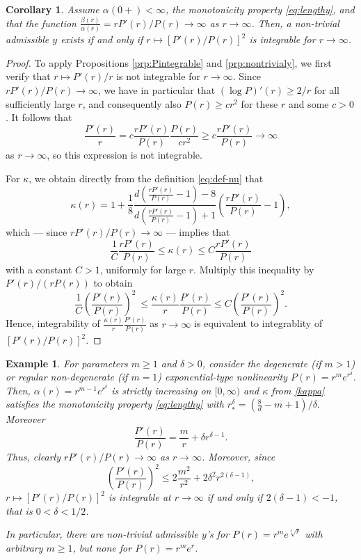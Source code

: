 \documentclass[reqno]{amsart}
\newtheorem{corollary}[lemma]{Corollary}
\newtheorem{example}[lemma]{Example}
\begin{document}
%
\begin{corollary}
    Assume $\alpha(0+)<\infty$, the monotonicity property \eqref{eq:lengthy}, and that the function $\frac{\beta(r)}{\alpha(r)}= rP'(r)/P(r)\to\infty$ as $r\to\infty$. Then, a non-trivial admissible $y$ exists if and only if $r\mapsto[P'(r)/P(r)]^2$ is integrable for $r\to\infty$.
\end{corollary}
%
\begin{proof}
    To apply Propositions \ref{prp:Pintegrable} and \ref{prp:nontrivialy}, we first verify that $r\mapsto P'(r)/r$ is not integrable for $r\to\infty$. Since $rP'(r)/P(r)\to\infty$, we have in particular that $(\log P)'(r)\ge 2/r$ for all sufficiently large $r$, and consequently also $P(r)\ge cr^2$ for these $r$ and some $c>0$. It follows that
    \[ \frac{P'(r)}r = c\frac{rP'(r)}{P(r)}\frac{P(r)}{cr^2} \ge c\frac{rP'(r)}{P(r)} \to \infty \]
    as $r\to\infty$, so this expression is not integrable.  
  
    For $\kappa$, we obtain directly from the definition \eqref{eq:def-nu} that
    \begin{equation}\label{kappa}
     \kappa(r) = 1+ \frac18\frac{d\left(\frac{rP'(r)}{P(r)}-1\right)-8}{d\left(\frac{rP'(r)}{P(r)}-1\right)+1}\left(\frac{rP'(r)}{P(r)}-1\right), 
    \end{equation}
    which --- since $rP'(r)/P(r)\to\infty$ --- implies that 
    \[ \frac1C\frac{rP'(r)}{P(r)} \le \kappa(r) \le C\frac{rP'(r)}{P(r)} \]
    with a constant $C>1$, uniformly for large $r$.
    Multiply this inequality by $P'(r)/(rP(r))$ to obtain
    \[ \frac1C\left(\frac{P'(r)}{P(r)}\right)^2\ \le \frac{\kappa(r)}r\frac{P'(r)}{P(r)} \le C\left(\frac{P'(r)}{P(r)}\right)^2. \]
    Hence, integrability of $\frac{\kappa(r)}r\frac{P'(r)}{P(r)}$ as $r\to\infty$ is equivalent to integrablity of $[P'(r)/P(r)]^2$.
\end{proof}
%
\begin{example}\label{ex:power-exp}
    For parameters $m\ge1$ and $\delta>0$, consider the degenerate (if $m>1$) or regular non-degenerate (if $m=1$) exponential-type nonlinearity $P(r)=r^me^{r^\delta}$. 
    Then, $\alpha(r)=r^{m-1}e^{r^\delta}$ is strictly increasing on $[0,\infty)$ and $\kappa$ from \eqref{kappa} satisfies the monotonicity property \eqref{eq:lengthy} with $r_*^\delta=(\frac8d-m+1)/\delta.$  
    Moreover  
    \[\frac{P'(r)}{P(r)} = \frac mr + \delta r^{\delta-1}. \]
    Thus, clearly $rP'(r)/P(r)\to\infty$ as $r\to\infty$. Moreover, since
    \[ 
    \left(\frac{P'(r)}{P(r)}\right)^2 \le 2\frac{m^2}{r^2}+2\delta^2r^{2(\delta-1)},
    \]
    $r\mapsto[P'(r)/P(r)]^2$ is integrable at $r\to\infty$ if and only if $2(\delta-1)<-1$, that is $0<\delta<1/2$.
    
    In particular, there are non-trivial admissible $y$'s for $P(r)=r^me^{\sqrt[3]{r}}$ with arbitrary $m\ge1$, but none for $P(r)=r^me^r$.
\end{example}
\end{document}
